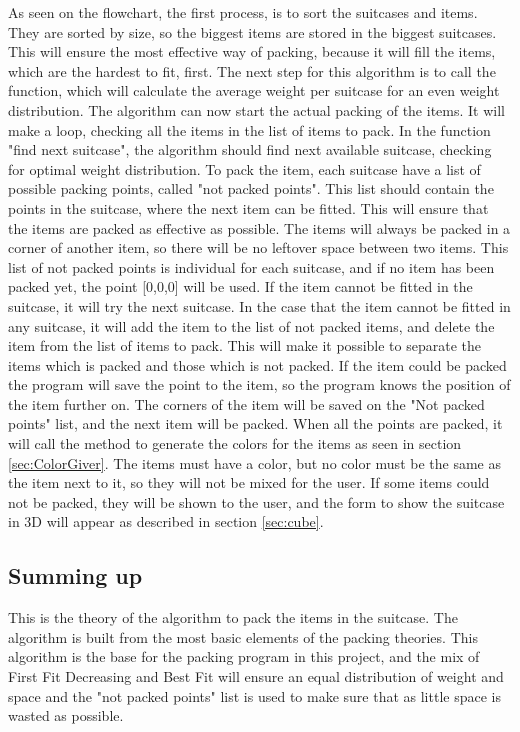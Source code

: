 As seen on the flowchart, the first process, is to sort the suitcases and items. They are sorted by size, so the biggest items are stored in the biggest suitcases. This will ensure the most effective way of packing, because it will fill the items, which are the hardest to fit, first. The next step for this algorithm is to call the function, which will calculate the average weight per suitcase for an even weight distribution. The algorithm can now start the actual packing of the items.
It will make a loop, checking all the items in the list of items to pack. In the function "find next suitcase", the algorithm should find next available suitcase, checking for optimal weight distribution. To pack the item, each suitcase have a list of possible packing points, called "not packed points". This list should contain the points in the suitcase, where the next item can be fitted. This will ensure that the items are packed as effective as possible. The items will always be packed in a corner of another item, so there will be no leftover space between two items. This list of not packed points is individual for each suitcase, and if no item has been packed yet, the point [0,0,0] will be used. If the item cannot be fitted in the suitcase, it will try the next suitcase. In the case that the item cannot be fitted in any suitcase, it will add the item to the list of not packed items, and delete the item from the list of items to pack. This will make it possible to separate the items which is packed and those which is not packed. If the item could be packed the program will save the point to the item, so the program knows the position of the item further on. The corners of the item will be saved on the "Not packed points" list, and the next item will be packed.
When all the points are packed, it will call the method to generate the colors for the items as seen in section \ref{sec:ColorGiver}. The items must have a color, but no color must be the same as the item next to it, so they will not be mixed for the user. If some items could not be packed, they will be shown to the user, and the form to show the suitcase in 3D will appear as described in section \ref{sec:cube}.

\subsection{Summing up}
This is the theory of the algorithm to pack the items in the suitcase. The algorithm is built from the most basic elements of the packing theories. This algorithm is the base for the packing program in this project, and the mix of First Fit Decreasing and Best Fit will ensure an equal distribution of weight and space and the "not packed points" list is used to make sure that as little space is wasted as possible.